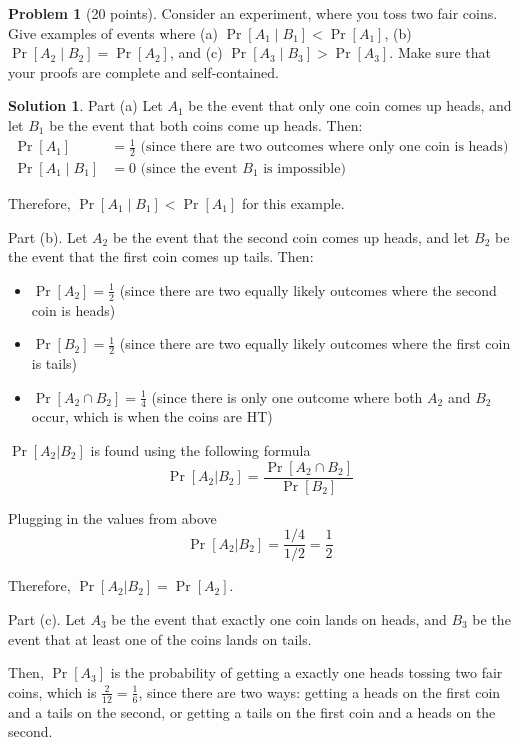 \documentclass{article}
\theoremstyle{definition}
\newtheorem{problem}{Problem}
\newtheorem*{solution}{Solution}
\begin{document}
\clearpage
\begin{problem}[20 points] 
Consider an experiment, where you toss two fair coins. 
Give examples of events where (a) $\Pr[A_1 \mid B_1] < \Pr[A_1]$, 
(b) $\Pr[A_2 \mid B_2] =  \Pr[A_2]$, and (c) $\Pr[A_3 \mid B_3] > \Pr[A_3]$. Make
sure that your proofs are complete and self-contained. 
\end{problem}
\begin{solution}
Part (a)
\noindent
Let $A_1$ be the event that only one coin comes up heads, and let $B_1$ be the event that both coins come up heads. Then:
\begin{align*}
\Pr[A_1] &=\frac{1}{2} \text{ (since there are two outcomes where only one coin is heads)} \\
\Pr[A_1 \mid B_1] &=0 \text{ (since the event $B_1$ is impossible)}
\end{align*}

\noindent
Therefore, $\Pr[A_1\mid B_1]<\Pr[A_1]$ for this example.

\noindent
Part (b). Let $A_2$ be the event that the second coin comes up heads, and let $B_2$ be the event that the first coin comes up tails. Then:

\begin{itemize}
    \item $\displaystyle\Pr[A_2] = \frac{1}{2}$ (since there are two equally likely outcomes where the second coin is heads)
    \item $\displaystyle\Pr[B_2] = \frac{1}{2}$ (since there are two equally likely outcomes where the first coin is tails)
    \item $\displaystyle\Pr[A_2 \cap B_2] = \frac{1}{4}$ (since there is only one outcome where both $A_2$ and $B_2$ occur, which is when the coins are HT)
\end{itemize}
$\Pr[A_2|B_2]$ is found using the following formula
\[
\Pr[A_2|B_2]=\frac{\Pr[A_2 \cap B_2]}{\Pr[B_2]}
\]

\noindent
Plugging in the values from above
\[\Pr[A_2|B_2]=\frac{1/4}{1/2}=\frac{1}{2}\]

\noindent
Therefore, $\Pr[A_2|B_2] = \Pr[A_2]$.

\clearpage
\noindent
Part (c). Let $A_3$ be the event that exactly one coin lands on heads, and $B_3$ be the event that at least one of the coins lands on tails.

\noindent
Then, $\Pr[A_3]$ is the probability of getting a exactly one heads tossing two fair coins, which is $\displaystyle\frac{2}{12}=\frac{1}{6}$, since there are two ways: getting a heads on the first coin and a tails on the second, or getting a tails on the first coin and a heads on the second.


\end{solution}
\end{document}
